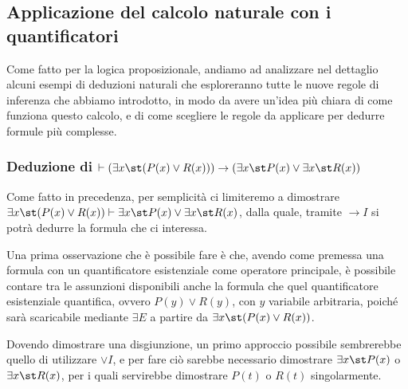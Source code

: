 \subsection{Applicazione del calcolo naturale con i quantificatori}

Come fatto per la logica proposizionale, andiamo ad analizzare nel dettaglio alcuni esempi di deduzioni naturali che esploreranno tutte le nuove regole di inferenza che abbiamo introdotto, in modo da avere un'idea più chiara di come funziona questo calcolo, e di come scegliere le regole da applicare per dedurre formule più complesse.

\subsubsection*{Deduzione di \(\vdash (\exists x\st (P(x)\lor R(x)) )\to (\exists x\st P(x) \lor \exists x\st R(x))\)}

Come fatto in precedenza, per semplicità ci limiteremo a dimostrare \(\exists x\st (P(x)\lor R(x)) \vdash \exists x\st P(x) \lor \exists x\st R(x)\), dalla quale, tramite \(\to I\) si potrà dedurre la formula che ci interessa.

Una prima osservazione che è possibile fare è che, avendo come premessa una formula con un quantificatore esistenziale come operatore principale, è possibile contare tra le assunzioni disponibili anche la formula che quel quantificatore esistenziale quantifica, ovvero \(P(y)\lor R(y)\), con \(y\) variabile arbitraria, poiché sarà scaricabile mediante \(\exists E\) a partire da \(\exists x\st (P(x)\lor R(x))\).

Dovendo dimostrare una disgiunzione, un primo approccio possibile sembrerebbe quello di utilizzare \(\lor I\), e per fare ciò sarebbe necessario dimostrare \(\exists x\st P(x)\) o \(\exists x\st R(x)\), per i quali servirebbe dimostrare \(P(t)\) o \(R(t)\) singolarmente.


\begin{center}
  \begin{minipage}{0.42\textwidth}
    \centering
    \begin{prooftree}

    \end{prooftree}
  \end{minipage}
  \hspace{0.3cm}
  \begin{minipage}{0.42\textwidth}
    \centering
    \begin{prooftree}

    \end{prooftree}
  \end{minipage}
\end{center}

